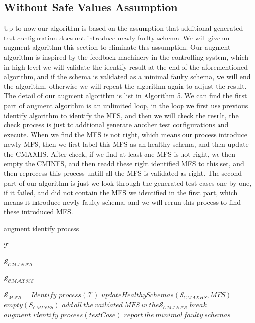 \documentclass[10pt,journal,cspaper,compsoc]{IEEEtran}
\begin{document}
\subsection{Without Safe Values Assumption}
Up to now our algorithm is based on the assumption that additional generated test configuration does not introduce newly faulty schema. We will give an augment algorithm this section to eliminate this assumption.
Our augment algorithm is inspired by the feedback machinery in the controlling system, which in high level we will validate the identify result at the end of the aforementioned algorithm, and if the schema is validated as a minimal faulty schema, we will end the algorithm, otherwise we will repeat the algorithm again to adjust the result. The detail of our augment algorithm is list in Algorithm 5. We can find the first part of augment algorithm is an unlimited loop, in the loop we first use previous identify algorithm to identify the MFS, and then we will check the result, the check process is just to addtional generate another test configurations and execute. When we find the MFS is not right, which means our process introduce newly MFS, then we first label this MFS as an healthy schema, and then update the CMAXHS. After check, if we find at least one MFS is not right, we then empty the CMINFS, and then readd these right identified MFS to this set, and then reprocess this process untill all the MFS is validated as right. The second part of our algorithm is just we look through the generated test cases one by one, if it failed, and did not contain the MFS we identified in the first part, which means it introduce newly faulty schema, and we will rerun this process to find these introduced MFS.
\begin{algorithm}
  \caption{augment identify process}
  \begin{algorithmic}[1]
    \Require  $\mathcal{T}$ 

     $\mathcal{S_{CMINFS}}$ 

     $\mathcal{S_{CMAXHS}}$ 

       \State $\mathcal{S_{MFS}} = Identify\_process(\mathcal{T})$
         \State $updateHealthySchemas(S_{CMAXHS},MFS)$
       \EndIf
       \EndFor
          \State $empty(S_{CMINFS})$
          \State $add\ all\ the\ vaildated\ MFS\ in\ the \mathcal{S_{CMINFS}}$
       \Else
           \State $break$
       \EndIf
      \EndWhile
           \State $augment\_identify\_process(testCase)$
         \EndIf
      \EndFor
      \State $report\ the\ minimal\ faulty\ schemas$
  \end{algorithmic}
\end{algorithm}
\end{document}
